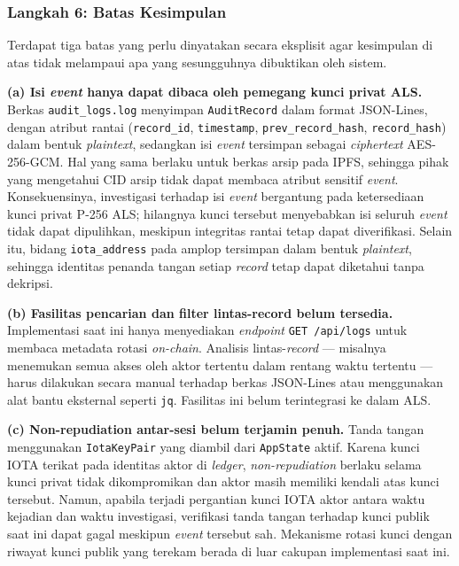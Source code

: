 \subsubsection{Langkah 6: Batas Kesimpulan}
 
Terdapat tiga batas yang perlu dinyatakan secara eksplisit agar kesimpulan
di atas tidak melampaui apa yang sesungguhnya dibuktikan oleh sistem.
 
\textbf{(a) Isi \textit{event} hanya dapat dibaca oleh pemegang kunci privat
ALS.} Berkas \texttt{audit\_logs.log} menyimpan \texttt{AuditRecord} dalam
format JSON-Lines, dengan atribut rantai (\texttt{record\_id},
\texttt{timestamp}, \texttt{prev\_record\_hash}, \texttt{record\_hash}) dalam
bentuk \textit{plaintext}, sedangkan isi \textit{event} tersimpan sebagai
\textit{ciphertext} AES-256-GCM. Hal yang sama berlaku untuk berkas arsip pada
IPFS, sehingga pihak yang mengetahui CID arsip tidak dapat membaca atribut
sensitif \textit{event}. Konsekuensinya, investigasi terhadap isi \textit{event}
bergantung pada ketersediaan kunci privat P-256 ALS; hilangnya kunci tersebut
menyebabkan isi seluruh \textit{event} tidak dapat dipulihkan, meskipun
integritas rantai tetap dapat diverifikasi. Selain itu, bidang
\texttt{iota\_address} pada amplop tersimpan dalam bentuk \textit{plaintext},
sehingga identitas penanda tangan setiap \textit{record} tetap dapat diketahui
tanpa dekripsi.
 
\textbf{(b) Fasilitas pencarian dan filter lintas-record belum tersedia.}
Implementasi saat ini hanya menyediakan \textit{endpoint} \texttt{GET /api/logs}
untuk membaca metadata rotasi \textit{on-chain}. Analisis lintas-\textit{record}
--- misalnya menemukan semua akses oleh aktor tertentu dalam rentang waktu
tertentu --- harus dilakukan secara manual terhadap berkas JSON-Lines atau
menggunakan alat bantu eksternal seperti \texttt{jq}. Fasilitas ini belum
terintegrasi ke dalam ALS.
 
\textbf{(c) Non-repudiation antar-sesi belum terjamin penuh.} Tanda tangan
menggunakan \texttt{IotaKeyPair} yang diambil dari \texttt{AppState} aktif.
Karena kunci IOTA terikat pada identitas aktor di \textit{ledger}, \textit{non-repudiation}
berlaku selama kunci privat tidak dikompromikan dan aktor masih memiliki kendali
atas kunci tersebut. Namun, apabila terjadi pergantian kunci IOTA aktor
antara waktu kejadian dan waktu investigasi, verifikasi tanda tangan terhadap
kunci publik saat ini dapat gagal meskipun \textit{event} tersebut sah.
Mekanisme rotasi kunci dengan riwayat kunci publik yang terekam berada di luar
cakupan implementasi saat ini.

